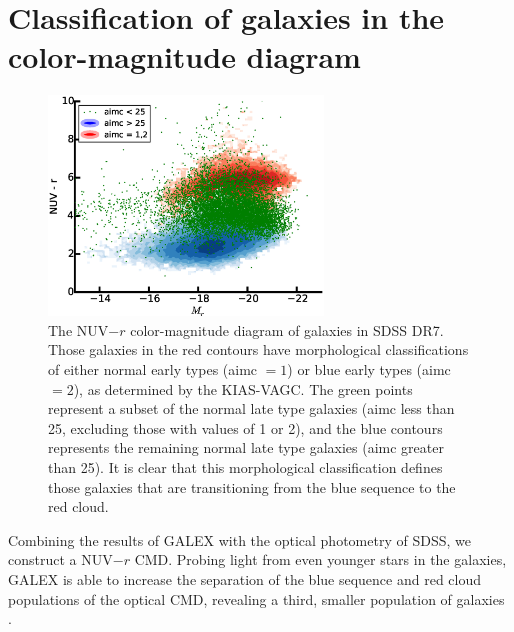 

\section[Results]{Classification of galaxies in the color-magnitude diagram}

\begin{figure}
    \includegraphics[width=0.65\textwidth]{Images/GV/NUVr_CMD_3pop_scatter}
    \caption[NUV-$r$ color-magnitude diagram of SDSS galaxies]{The NUV$-r$ 
    color-magnitude diagram of galaxies in SDSS DR7.  Those galaxies in the red 
    contours have morphological classifications of either normal early types 
    (aimc $=1$) or blue early types (aimc $=2$), as determined by the KIAS-VAGC.  
    The green points represent a subset of the normal late type galaxies (aimc 
    less than 25, excluding those with values of 1 or 2), and the blue contours 
    represents the remaining normal late type galaxies (aimc greater than 25).  
    It is clear that this morphological classification defines those galaxies 
    that are transitioning from the blue sequence to the red cloud.}
    \label{fig:NUVr_CMD}
\end{figure}

Combining the results of GALEX with the optical photometry of SDSS, we construct 
a NUV$-r$ CMD.  Probing light from even younger stars in the galaxies, GALEX is 
able to increase the separation of the blue sequence and red cloud populations 
of the optical CMD, revealing a third, smaller population of galaxies 
\citep{Wyder07}.

